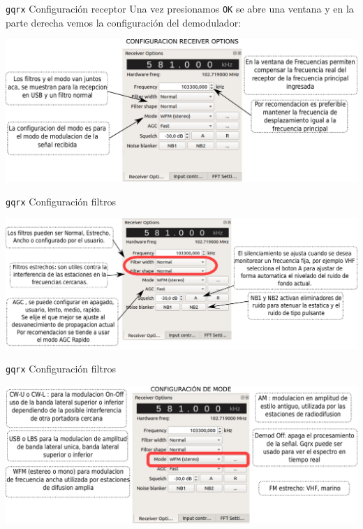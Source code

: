 \begin{frame}{{\tt gqrx} Configuración receptor}
Una vez presionamos {\tt OK} se abre una ventana y en la parte derecha vemos la
configuración del demodulador:
\vspace{0.5cm}

\begin{center}
\vspace{-0.3cm}
\includegraphics[width=.8\textwidth]{parte2/lab6/pdf/lab6_p_2.pdf}
\end{center}

\end{frame}

\begin{frame}{{\tt gqrx} Configuración filtros}

\begin{center}
\vspace{-0.3cm}
\includegraphics[width=\textwidth]{parte2/lab6/pdf/lab6_p_3.pdf}
\end{center}

\end{frame}

\begin{frame}{{\tt gqrx} Configuración filtros}

\begin{center}
\vspace{-0.3cm}
\includegraphics[width=\textwidth]{parte2/lab6/pdf/lab6_p_4.pdf}
\end{center}

\end{frame}

